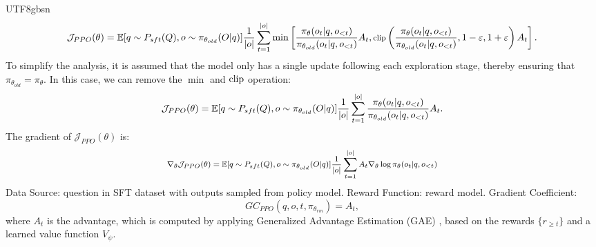 \documentclass[11pt, a4paper, logo, copyright, nonumbering]{deepseek}
\renewcommand{\epsilon}{\varepsilon}
\begin{document}
\begin{CJK*}{UTF8}{gbsn}
\begin{equation}
\footnotesize
    \mathcal{J}_{PPO}(\theta) = \mathbb{E}{[q \sim P_{sft}(Q), o \sim \pi_{\theta_{old}}(O|q)]} \frac{1}{|o|} \sum_{t=1}^{|o|} \min \left[ \frac{\pi_\theta(o_{t} | q, o_{<t})}{\pi_{\theta_{old}}(o_{t} | q, o_{<t})} A_{t}, \text{clip} \left( \frac{\pi_\theta(o_{t} | q, o_{<t})}{\pi_{\theta_{old}}(o_{t} | q, o_{<t})}, 1 - \epsilon, 1 + \epsilon \right)  A_{t} \right].
\end{equation}
To simplify the analysis,  it is assumed that the model only has a single update following each exploration stage, thereby ensuring that $\pi_{\theta_{old}} = \pi_{\theta}$.
In this case, we can remove the $\min$ and ${\rm clip}$ operation:
\begin{equation}
\footnotesize
    \mathcal{J}_{PPO}(\theta) = \mathbb{E}{[q \sim P_{sft}(Q), o \sim \pi_{\theta_{old}}(O|q)]} \frac{1}{|o|} \sum_{t=1}^{|o|} \frac{\pi_\theta(o_{t} | q, o_{<t})}{\pi_{\theta_{old}}(o_{t} | q, o_{<t})} A_{t}.
\end{equation}
The gradient of $\mathcal{J}_{PPO}(\theta)$ is:
\begin{equation}
\footnotesize
\begin{split}
    \nabla_{\theta}\mathcal{J}_{PPO}(\theta) = \mathbb{E}{[q \sim P_{sft}(Q), o \sim \pi_{\theta_{old}}(O|q)]} \frac{1}{|o|} \sum_{t=1}^{|o|} A_t \nabla_{\theta}\log \pi_\theta(o_{t} | q, o_{<t})
\end{split}
\end{equation}
Data Source:  question in SFT dataset with outputs sampled from policy model.
Reward Function: reward model.
Gradient Coefficient:
\begin{equation}
    GC_{PPO}(q, o, t, \pi_{\theta_{rm}}) = A_t,
\label{eq:GC-PPO}
\end{equation}
where $A_t$ is the advantage, which is computed by applying Generalized Advantage Estimation (GAE) \citep{gae}, based on the rewards  $\{r_{\ge t}\}$  and a learned value function  $V_{\psi}$. 


\end{CJK*}
\end{document}
